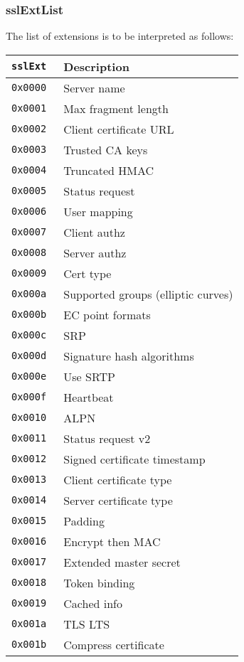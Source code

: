 \documentclass[documentation]{subfiles}
\begin{document}
\subsubsection{sslExtList}\label{sslExtList}
The list of extensions is to be interpreted as follows:

\begin{minipage}{.48\textwidth}
    \begin{longtable}{>{\tt}rl}
        \toprule
        {\bf sslExt} & {\bf Description}\\
        \midrule\endhead%
        0x0000 & Server name\\
        0x0001 & Max fragment length\\
        0x0002 & Client certificate URL\\
        0x0003 & Trusted CA keys\\
        0x0004 & Truncated HMAC\\
        0x0005 & Status request\\
        0x0006 & User mapping\\
        0x0007 & Client authz\\
        0x0008 & Server authz\\
        0x0009 & Cert type\\
        0x000a & Supported groups (elliptic curves)\\
        0x000b & EC point formats\\
        0x000c & SRP\\
        0x000d & Signature hash algorithms\\
        0x000e & Use SRTP\\
        0x000f & Heartbeat\\
        0x0010 & ALPN\\
        0x0011 & Status request v2\\
        0x0012 & Signed certificate timestamp\\
        0x0013 & Client certificate type\\
        0x0014 & Server certificate type\\
        0x0015 & Padding\\
        0x0016 & Encrypt then MAC\\
        0x0017 & Extended master secret\\
        0x0018 & Token binding\\
        0x0019 & Cached info\\
        0x001a & TLS LTS\\
        0x001b & Compress certificate\\

\end{longtable}
\end{minipage}
\end{document}
